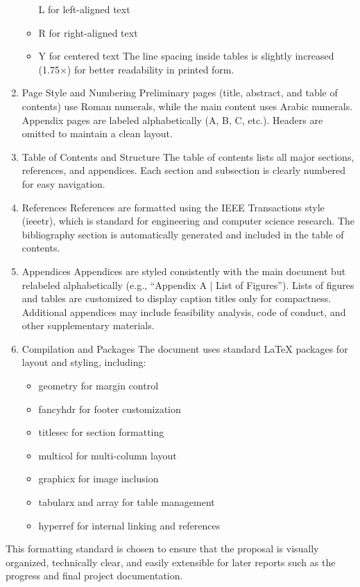\begin{enumerate}
\begin{itemize}
        L for left-aligned text
        \item
        R for right-aligned text
        \item
        Y for centered text
        The line spacing inside tables is slightly increased (1.75×) for better readability in printed form.
        \end{itemize}
        \item
        Page Style and Numbering
        Preliminary pages (title, abstract, and table of contents) use Roman numerals, while the main content uses Arabic numerals. Appendix pages are labeled alphabetically (A, B, C, etc.). Headers are omitted to maintain a clean layout.
        \item
        Table of Contents and Structure
        The table of contents lists all major sections, references, and appendices. Each section and subsection is clearly numbered for easy navigation.
        \item
        References
        References are formatted using the IEEE Transactions style (ieeetr), which is standard for engineering and computer science research. The bibliography section is automatically generated and included in the table of contents.
        \item
        Appendices
        Appendices are styled consistently with the main document but relabeled alphabetically (e.g., “Appendix A | List of Figures”). Lists of figures and tables are customized to display caption titles only for compactness. Additional appendices may include feasibility analysis, code of conduct, and other supplementary materials.
        \item
        Compilation and Packages
        The document uses standard LaTeX packages for layout and styling, including:
        \begin{itemize}
            \item
            geometry for margin control
            \item
            fancyhdr for footer customization
            \item
            titlesec for section formatting
            \item
            multicol for multi-column layout
            \item
            graphicx for image inclusion
            \item
            tabularx and array for table management
            \item
            hyperref for internal linking and references
            \end{itemize}
\end{enumerate}

This formatting standard is chosen to ensure that the proposal is visually organized, technically clear, and easily extensible for later reports such as the progress and final project documentation.